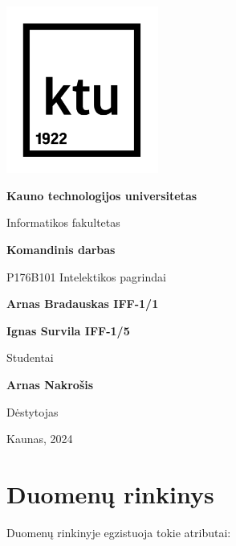 \documentclass[14pt]{extarticle}
\begin{document}
\begin{titlepage}
	\begin{center}
		\includegraphics[width=5cm]{images/ktu_logo.png}

		\textbf{Kauno technologijos universitetas}

		Informatikos fakultetas

		\vspace{3cm}

		\textbf{Komandinis darbas}

		\vspace{0.5cm}
		P176B101 Intelektikos pagrindai

	\end{center}

	\begin{flushright}

		\vfill

		\textbf{Arnas Bradauskas IFF-1/1}

		\textbf{Ignas Survila IFF-1/5}

		Studentai

		\vspace{0.2cm}

		\textbf{Arnas Nakrošis}

		Dėstytojas

	\end{flushright}

	\begin{center}
		Kaunas, 2024
	\end{center}

\end{titlepage}

\tableofcontents

\clearpage

\section{Duomenų rinkinys}

Duomenų rinkinyje egzistuoja tokie atributai:
\end{document}
